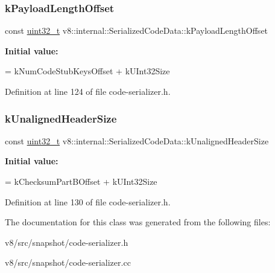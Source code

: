 \subsubsection{\texorpdfstring{k\+Payload\+Length\+Offset}{kPayloadLengthOffset}}
{\footnotesize\ttfamily const \mbox{\hyperlink{classuint32__t}{uint32\+\_\+t}} v8\+::internal\+::\+Serialized\+Code\+Data\+::k\+Payload\+Length\+Offset\hspace{0.3cm}{\ttfamily [static]}}

{\bfseries Initial value\+:}
\begin{DoxyCode}
=
      kNumCodeStubKeysOffset + kUInt32Size
\end{DoxyCode}


Definition at line 124 of file code-\/serializer.\+h.

\mbox{\label{classv8_1_1internal_1_1SerializedCodeData_a32b0061e3ce874540975d09a6242c1a9}} 
\subsubsection{\texorpdfstring{k\+Unaligned\+Header\+Size}{kUnalignedHeaderSize}}
{\footnotesize\ttfamily const \mbox{\hyperlink{classuint32__t}{uint32\+\_\+t}} v8\+::internal\+::\+Serialized\+Code\+Data\+::k\+Unaligned\+Header\+Size\hspace{0.3cm}{\ttfamily [static]}}

{\bfseries Initial value\+:}
\begin{DoxyCode}
=
      kChecksumPartBOffset + kUInt32Size
\end{DoxyCode}


Definition at line 130 of file code-\/serializer.\+h.



The documentation for this class was generated from the following files\+:\begin{DoxyCompactItemize}
\item 
v8/src/snapshot/code-\/serializer.\+h\item 
v8/src/snapshot/code-\/serializer.\+cc\end{DoxyCompactItemize}
